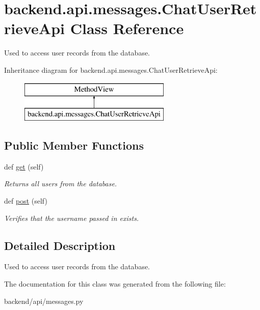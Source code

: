 \hypertarget{classbackend_1_1api_1_1messages_1_1_chat_user_retrieve_api}{}\section{backend.\+api.\+messages.\+Chat\+User\+Retrieve\+Api Class Reference}
\label{classbackend_1_1api_1_1messages_1_1_chat_user_retrieve_api}


Used to access user records from the database.  


Inheritance diagram for backend.\+api.\+messages.\+Chat\+User\+Retrieve\+Api\+:\begin{figure}[H]
\begin{center}
\leavevmode
\includegraphics[height=2.000000cm]{classbackend_1_1api_1_1messages_1_1_chat_user_retrieve_api}
\end{center}
\end{figure}
\subsection*{Public Member Functions}
\begin{DoxyCompactItemize}
\item 
\hypertarget{classbackend_1_1api_1_1messages_1_1_chat_user_retrieve_api_ad44623170ce6ad8b7ea94014701ad3f4}{}def \hyperlink{classbackend_1_1api_1_1messages_1_1_chat_user_retrieve_api_ad44623170ce6ad8b7ea94014701ad3f4}{get} (self)\label{classbackend_1_1api_1_1messages_1_1_chat_user_retrieve_api_ad44623170ce6ad8b7ea94014701ad3f4}

\begin{DoxyCompactList}\small\item\em Returns all users from the database. \end{DoxyCompactList}\item 
\hypertarget{classbackend_1_1api_1_1messages_1_1_chat_user_retrieve_api_ad90a49275a9f35e1311fbca54793b8d3}{}def \hyperlink{classbackend_1_1api_1_1messages_1_1_chat_user_retrieve_api_ad90a49275a9f35e1311fbca54793b8d3}{post} (self)\label{classbackend_1_1api_1_1messages_1_1_chat_user_retrieve_api_ad90a49275a9f35e1311fbca54793b8d3}

\begin{DoxyCompactList}\small\item\em Verifies that the username passed in exists. \end{DoxyCompactList}\end{DoxyCompactItemize}


\subsection{Detailed Description}
Used to access user records from the database. 

The documentation for this class was generated from the following file\+:\begin{DoxyCompactItemize}
\item 
backend/api/messages.\+py\end{DoxyCompactItemize}
